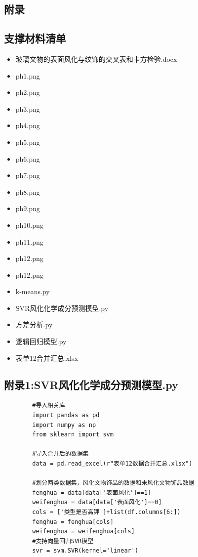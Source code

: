 \documentclass[withoutpreface,bwprint]{cumcmthesis}%
\begin{document}
	\newpage
	\begin{appendices}
	
	\section{附录}
	\subsection{支撑材料清单}
	\begin{itemize}
		\item 玻璃文物的表面风化与纹饰的交叉表和卡方检验.docx
		\item ph1.png
		\item ph2.png
		\item ph3.png
		\item ph4.png
		\item ph5.png
		\item ph6.png
		\item ph7.png
	    \item ph8.png
        \item ph9.png
        \item ph10.png
        \item ph11.png
        \item ph12.png
        \item ph12.png
		\item k-means.py
		\item SVR风化化学成分预测模型.py
		\item 方差分析.py
		\item 逻辑回归模型.py
		\item 表单12合并汇总.xlsx
	\end{itemize}
	
	
	\subsection{附录1:SVR风化化学成分预测模型.py}
	\begin{lstlisting}
		#导入相关库
		import pandas as pd
		import numpy as np
		from sklearn import svm
		
		#导入合并后的数据集
		data = pd.read_excel(r"表单12数据合并汇总.xlsx")
		
		#划分两类数据集，风化文物饰品的数据和未风化文物饰品数据
		fenghua = data[data['表面风化']==1]
		weifenghua = data[data['表面风化']==0]
		cols = ['类型是否高钾']+list(df.columns[6:])
		fenghua = fenghua[cols]
		weifenghua = weifenghua[cols]
		#支持向量回归SVR模型
		svr = svm.SVR(kernel='linear')
		

\end{lstlisting}
\end{appendices}
\end{document}
